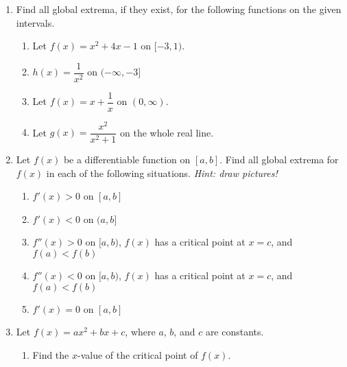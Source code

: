 \documentclass[11pt]{article}
\begin{document}
\drawtitle
\begin{enumerate}
\item Find all global extrema, if they exist, for the following
  functions on the given intervals.
  \begin{enumerate}

  \item Let $f(x) = x^2 + 4x - 1$ on $[-3,1)$.
    \vfill
    
  \item $h(x)=\dfrac{1}{x^2}$ on $(-\infty,-3]$
    \vfill

    \newpage

  \item Let $f(x)=x+\dfrac{1}{x}$ on $(0,\infty)$.
    \vfill
    
  \item Let $g(x)=\dfrac{x^2}{x^2+1}$ on the whole real line.
    \vfill

  \end{enumerate}
  
  \newpage
  
\item Let $f(x)$ be a differentiable function on $[a,b]$. Find all
  global extrema for $f(x)$ in each of the following
  situations. \textit{Hint: draw pictures!}
  \begin{enumerate}
  \item $f'(x) > 0$ on $[a,b]$
    \vfill

  \item $f'(x) < 0$ on $(a,b]$
    \vfill

  \item $f''(x) > 0$ on $[a,b)$, $f(x)$ has a critical point at $x=c$,
    and $f(a) < f(b)$
    \vfill

  \item $f''(x) < 0$ on $[a,b)$, $f(x)$ has a critical point at $x=c$,
    and $f(a) < f(b)$
    \vfill

  \item $f'(x) = 0$ on $[a,b]$
    \vfill

  \end{enumerate}

\newpage

\item Let $f(x)=ax^2+bx+c$, where $a$, $b$, and $c$ are constants.
  
  \begin{enumerate}
  \item Find the $x$-value of the critical point of $f(x)$.
    

\end{enumerate}
\end{enumerate}
\end{document}
